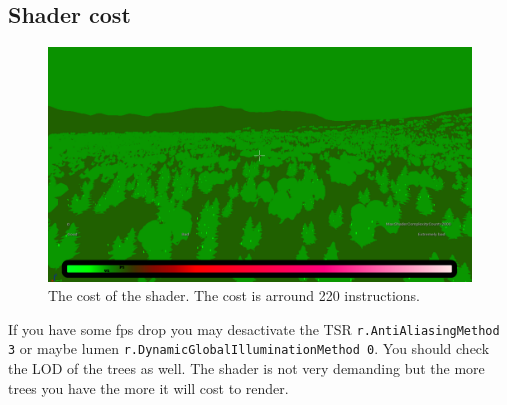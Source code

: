 \documentclass[../main.tex]{subfile}
\begin{document}
\subsection{Shader cost}
\begin{figure}[H]
    \centering
    \includegraphics[width=1\textwidth]{Ressources/Opti.png}
    \caption{The cost of the shader. The cost is arround 220 instructions.}
    \end{figure}
If you have some fps drop you may desactivate the TSR \texttt{r.AntiAliasingMethod 3} or maybe lumen \texttt{r.DynamicGlobalIlluminationMethod 0}.
You should check the LOD of the trees as well. The shader is not very demanding but the more trees you have the more it will cost to render.\\
\end{document}
